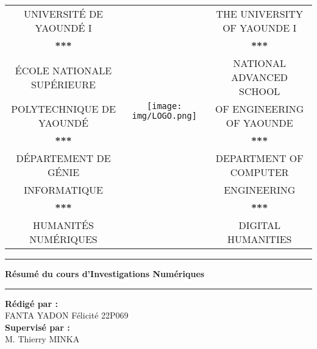 \documentclass[11pt]{article}
\begin{document}
\begin{center}\hspace*{-0.5cm}
  \begin{tabular}{ccc}
 
    {\large UNIVERSIT\'E DE YAOUND\'E I} & \multirow{8}{*}{\texttt{[image: img/LOGO.png]}} & \large{ THE UNIVERSITY OF YAOUNDE I}\\
    \textbf{***} &    & \textbf{***} \\
    \textcolor{-yellow}{\'ECOLE NATIONALE SUP\'ERIEURE}& & \textcolor{-yellow}{NATIONAL ADVANCED SCHOOL}\\ 
    \textcolor{-yellow}{POLYTECHNIQUE DE YAOUND\'E}   & & \textcolor{-yellow}{OF ENGINEERING OF YAOUNDE} \\
    \textbf{***}    & & \textbf{***} \\
    D\'EPARTEMENT DE G\'ENIE& & DEPARTMENT OF COMPUTER \\ 
    INFORMATIQUE & & ENGINEERING \\
    \textbf{***} &    & \textbf{***} \\
    \textcolor{-yellow}{HUMANITÉS NUMÉRIQUES} & & \textcolor{-yellow}{DIGITAL HUMANITIES}
    \end{tabular}
 
\end{center}
\vspace{2cm}

\pagestyle{fancy}
\begin{center}
\hrule height 2pt
\vspace{0.4cm}
{\LARGE \textbf{Résumé  du cours d'Investigations Numériques}}
\vspace{0.4cm}
\hrule height 2pt
\end{center}

\vspace{2cm}

\begin{center}
\textbf{Rédigé par :}\\[0.3cm]
FANTA YADON Félicité \hspace{0.5cm} 22P069\\[0.3cm]
\textbf{Supervisé par :}\\[0.3cm]
M. Thierry MINKA
\end{center}
\end{document}
